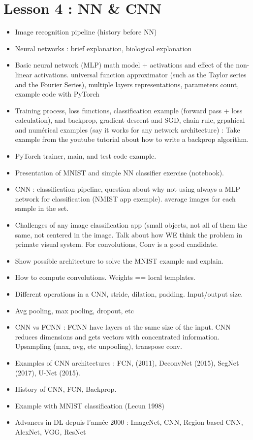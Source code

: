 \documentclass[12pt,a4paper]{article}
\begin{document}
\section*{Lesson 4 : NN \& CNN}
\begin{itemize}
    \item  Image recognition pipeline (history before NN)
    \item  Neural networks : brief explanation, biological
    explanation
    \item  Basic neural network (MLP) math model + activations
    and effect of the non-linear activations. universal
    function approximator (such as the Taylor series and
    the Fourier Series), multiple layers representations,
    parameters count, example code with PyTorch
    \item  Training process, loss functions, classification example
    (forward pass + loss calculation), and backprop,
    gradient descent and SGD, chain rule, grpahical and
    numérical examples (say it works for any network
    architecture) : Take example from the youtube tutorial about
    how to write a backprop algorithm.
    \item  PyTorch trainer, main, and test code example.
    \item  Presentation of MNIST and simple NN classifier exercise
    (notebook).
    \item  CNN : classification pipeline, question about why not using
    always a MLP network for classification (NMIST app exemple).
    average images for each sample in the set.
    \item  Challenges of any image classification app (small objects,
    not all of them the same, not centered in the image. Talk about
    how WE think the problem in primate visual system. For convolutions,
    Conv is a good candidate.
    \item  Show possible architecture to solve the MNIST example and explain.
    \item  How to compute convolutions. Weights == local templates.
    \item  Different operations in a CNN, stride, dilation, padding. Input/output size.
    \item  Avg pooling, max pooling, dropout, etc
    \item  CNN vs FCNN : FCNN have layers at the same size of the input.
    CNN reduces dimensions and gets vectors with concentrated information.
    Upsampling (max, avg, etc unpooling), transpose conv.
    \item  Examples of CNN architectures : FCN, (2011), DeconvNet (2015),
    SegNet (2017), U-Net (2015).
    \item  History of CNN, FCN, Backprop.
    \item  Example with MNIST classification (Lecun 1998)
    \item  Advances in DL depuis l'année 2000 : ImageNet, CNN, Region-based
    CNN, AlexNet, VGG, ResNet
\end{itemize}
\end{document}
